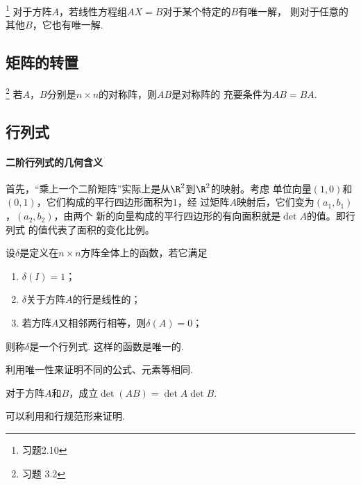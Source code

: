   \begin{pos}\footnote{习题2.10}
    对于方阵$A$，若线性方程组$AX=B$对于某个特定的$B$有唯一解，
    则对于任意的其他$B$，它也有唯一解.
  \end{pos}

\subsection{矩阵的转置}
   \begin{pos}\footnote{习题 3.2}
     若$A$，$B$分别是$n\times n$的对称阵，则$AB$是对称阵的
     充要条件为$AB=BA$.
   \end{pos}

\subsection{行列式}

  \paragraph{二阶行列式的几何含义}
    首先，“乘上一个二阶矩阵”实际上是从$\R^2$到$\R^2$的映射。考虑
    单位向量$(1,0)$和$(0,1)$，它们构成的平行四边形面积为$1$，经
    过矩阵$A$映射后，它们变为$(a_1,b_1)$，$(a_2,b_2)$，由两个
    新的向量构成的平行四边形的有向面积就是$\det A$的值。即行列式
    的值代表了面积的变化比例。

  \begin{thm}
    设$\delta$是定义在$n\times n$方阵全体上的函数，若它满足
    \begin{enumerate}
      \item $\delta(I)=1$；
      \item $\delta$关于方阵$A$的行是线性的；
      \item 若方阵$A$又相邻两行相等，则$\delta(A)=0$；
    \end{enumerate}
    则称$\delta$是一个行列式. 这样的函数是唯一的.
  \end{thm}
  \remark
    利用唯一性来证明不同的公式、元素等相同.

  \begin{thm}
    对于方阵$A$和$B$，成立$\det(AB)=\det A\det B$.
  \end{thm}
  \proof
    可以利用和行规范形来证明.

